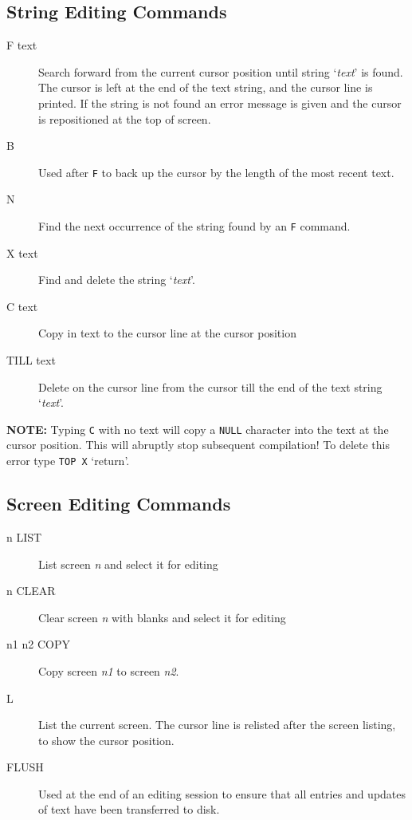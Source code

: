 \documentclass{article}
\newcommand{\n}{\textit{n}}
\begin{document}
\begin{multicols}{2}[]
	\subsection{String Editing Commands}
	\begin{description}
		\item[F text]
			Search forward from the current cursor position
			until string `\textit{text}' is found. The cursor is left at
			the end of the text string, and the cursor line is printed.
			If the string is not found an error message is given
			and the cursor is repositioned at the top of screen.
		\item[B]
			Used after \verb|F| to back up the cursor by the length
			of the most recent text.
		\item[N]
			Find the next occurrence of the string found by an
			\verb|F| command.
		\item[X text]
			Find and delete the string `\textit{text}'.
		\item[C text]
			Copy in text to the cursor line at the cursor position
		\item[TILL text]
			Delete on the cursor line from the cursor till the
			end of the text string `\textit{text}'.
	\end{description}
	\textbf{NOTE:} Typing \verb|C| with no text will copy a \verb|NULL| character
	into the text at the cursor position. This will abruptly stop subsequent
	compilation! To delete this error type \verb|TOP X| `return'.

	\subsection{Screen Editing Commands}
	\begin{description}
		\item[n LIST]
			List screen \n{} and select it for editing
		\item[n CLEAR]
			Clear screen \n{} with blanks and select it for editing
		\item[n1 n2 COPY]
			Copy screen \textit{n1} to screen \textit{n2}.
		\item[L]
			List the current screen. The cursor line is relisted
			after the screen listing, to show the cursor position.
		\item[FLUSH]
			Used at the end of an editing session to ensure that
			all entries and updates of text have been transferred
			to disk.
	\end{description}
\end{multicols}
\textbf{}
\end{document}
